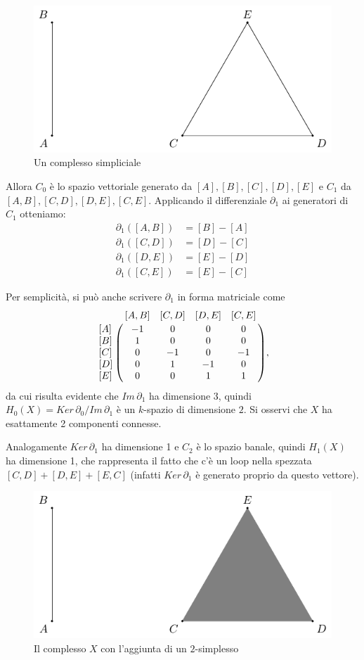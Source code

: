 \begin{figure}[h]
  \includegraphics[width=.7\linewidth]{gfx/example_homology.pdf}
  \caption{Un complesso simpliciale}
  \label{fig:simplicialcomplex}
\end{figure}

Allora $C_0$ è lo spazio vettoriale generato da $[A], [B], [C], [D], [E]$ e $C_1$ da $[A,B], [C,D], [D,E], [C,E]$.
Applicando il differenziale $\partial_1$ ai generatori di $C_1$ otteniamo:
\begin{align*}
  \partial_1([A,B]) &= [B] - [A]\\
  \partial_1([C,D]) &= [D] - [C]\\
  \partial_1([D,E]) &= [E] - [D]\\
  \partial_1([C,E]) &= [E] - [C]
\end{align*}

Per semplicità, si può anche scrivere $\partial_1$ in forma matriciale come
\begin{equation*}
  \bordermatrix{
     & [A,B] & [C,D] & [D,E] & [C,E]\cr
    [A] & -1 & 0 & 0 & 0 \cr
    [B] & 1 & 0 & 0 & 0 \cr
    [C] & 0 & -1 & 0 & -1 \cr
    [D] & 0 & 1 & -1 & 0\cr
    [E] & 0 & 0 & 1 & 1\cr
  },
\end{equation*}
da cui risulta evidente che $Im\,\partial_1$ ha dimensione 3, quindi $H_0(X) = Ker\,\partial_0 / Im\,\partial_1$ è un $k$-spazio di dimensione $2$. Si osservi che $X$ ha esattamente 2 componenti connesse.

Analogamente $Ker\,\partial_1$ ha dimensione 1 e $C_2$ è lo spazio banale, quindi $H_1(X)$ ha dimensione 1, che rappresenta il fatto che c'è un loop nella spezzata $[C,D] + [D,E] + [E,C]$ (infatti $Ker\,\partial_1$ è generato proprio da questo vettore).

\begin{figure}[h]
  \includegraphics[width=.7\linewidth]{gfx/example_homology_loop.pdf}
  \caption{Il complesso $X$ con l'aggiunta di un $2$-simplesso}
  \label{fig:simplicialcomplexloop}
\end{figure}

